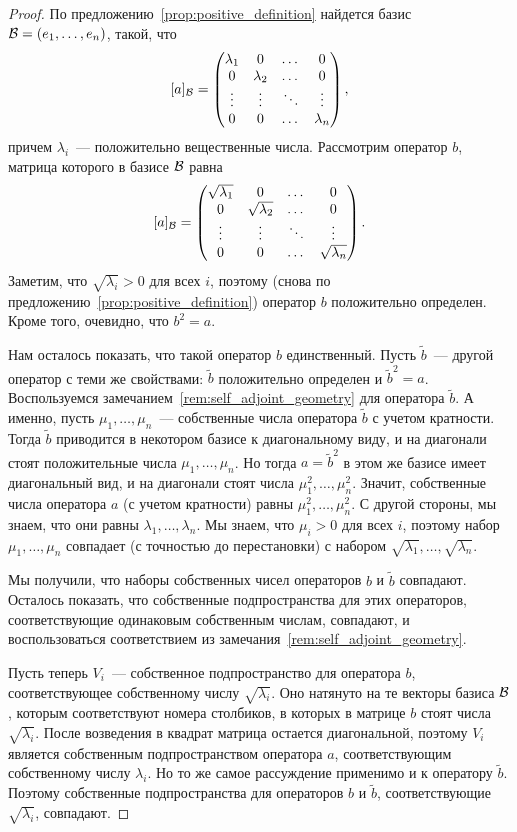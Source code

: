 \begin{proof}
По предложению~\ref{prop:positive_definition} найдется базис
$\mathcal B=(e_1,\dots,e_n)$, такой, что
$$
[a]_{\mathcal B} = \begin{pmatrix}\lambda_1 & 0 & \dots & 0 \\ 0 & \lambda_2 &
  \dots & 0\\ \vdots & \vdots & \ddots & \vdots \\ 0 & 0 & \dots &
  \lambda_n\end{pmatrix},
$$
причем $\lambda_i$~--- положительно вещественные числа. Рассмотрим
оператор $b$, матрица которого в базисе $\mathcal B$ равна
$$
[a]_{\mathcal B} = \begin{pmatrix}\sqrt{\lambda_1} & 0 & \dots & 0 \\ 0 & \sqrt{\lambda_2} &
  \dots & 0\\ \vdots & \vdots & \ddots & \vdots \\ 0 & 0 & \dots &
  \sqrt{\lambda_n}\end{pmatrix}.
$$
Заметим, что $\sqrt{\lambda_i}>0$ для всех $i$, поэтому (снова по
предложению~\ref{prop:positive_definition}) оператор $b$ положительно
определен. Кроме того, очевидно, что $b^2 = a$.

Нам осталось показать, что такой оператор $b$ единственный.
Пусть $\widetilde{b}$~--- другой оператор с теми же
свойствами: $\widetilde{b}$ положительно определен и $\widetilde{b}^2
= a$.
 Воспользуемся замечанием~\ref{rem:self_adjoint_geometry}
для оператора $\widetilde{b}$. А именно, пусть $\mu_1,\dots,\mu_n$~---
собственные числа оператора $\widetilde{b}$ с учетом кратности. Тогда
$\widetilde{b}$ приводится в некотором базисе к диагональному виду, и
на диагонали стоят положительные числа $\mu_1,\dots,\mu_n$. Но тогда $a =
\widetilde{b}^2$ в этом же базисе имеет диагональный вид, и на
диагонали стоят числа $\mu_1^2,\dots,\mu_n^2$. Значит, собственные
числа оператора $a$ (с учетом кратности) равны
$\mu_1^2,\dots,\mu_n^2$. С другой стороны, мы знаем, что они равны
$\lambda_1,\dots,\lambda_n$. Мы знаем, что $\mu_i>0$ для всех $i$,
поэтому набор $\mu_1,\dots,\mu_n$ совпадает (с точностью до
перестановки) с набором $\sqrt{\lambda_1},\dots,\sqrt{\lambda_n}$.

Мы получили, что наборы собственных чисел операторов $b$ и
$\widetilde{b}$ совпадают. Осталось показать, что собственные
подпространства для этих операторов, соответствующие одинаковым
собственным числам, совпадают, и воспользоваться соответствием из
замечания~\ref{rem:self_adjoint_geometry}.

Пусть теперь $V_i$~--- собственное подпространство для оператора $b$,
соответствующее собственному числу $\sqrt{\lambda_i}$. Оно натянуто на те
векторы базиса $\mathcal B$, которым соответствуют номера столбиков, в
которых в матрице $b$ стоят числа $\sqrt{\lambda_i}$. После возведения
в квадрат матрица остается диагональной, поэтому $V_i$ является
собственным подпространством оператора $a$, соответствующим
собственному числу $\lambda_i$. Но то же самое рассуждение применимо и
к оператору $\widetilde{b}$. Поэтому собственные подпространства для
операторов $b$ и $\widetilde{b}$, соответствующие $\sqrt{\lambda_i}$,
совпадают.
\end{proof}


